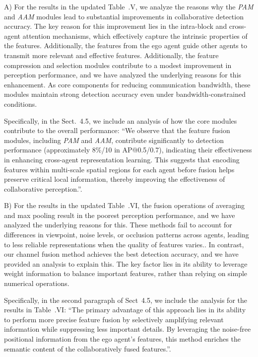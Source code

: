 \documentclass[12pt,a4paper]{article}
\begin{document}
A) For the results in the updated Table~.V, we analyze the reasons why the \textit{PAM} and \textit{AAM} modules lead to substantial improvements in collaborative detection accuracy. The key reason for this improvement lies in the intra-block and cross-agent attention mechanisms, which effectively capture the intrinsic properties of the features. Additionally, the features from the ego agent guide other agents to transmit more relevant and effective features.
Additionally, the feature compression and selection modules contribute to a modest improvement in perception performance, and we have analyzed the underlying reasons for this enhancement. As core components for reducing communication bandwidth, these modules maintain strong detection accuracy even under bandwidth-constrained conditions.

Specifically, in the Sect.~4.5, we include an analysis of how the core modules contribute to the overall performance: ``We observe that the feature fusion modules, including \textit{PAM} and \textit{AAM}, contribute significantly to detection performance (approximately 8\%/10 in AP@0.5/0.7), indicating their effectiveness in enhancing cross-agent representation learning.
This suggests that encoding features within multi-scale spatial regions for each agent before fusion helps preserve critical local information, thereby improving the effectiveness of collaborative perception.''.

B) For the results in the updated Table~.VI, the fusion operations of averaging and max pooling result in the poorest perception performance, and we have analyzed the underlying reasons for this.
These methods fail to account for differences in viewpoint, noise levels, or occlusion patterns across agents, leading to less reliable representations when the quality of features varies..
In contrast, our channel fusion method achieves the best detection accuracy, and we have provided an analysis to explain this. The key factor lies in its ability to leverage weight information to balance important features, rather than relying on simple numerical operations. 

Specifically, in the second paragraph of Sect~4.5, we include the analysis for the results in Table~.VI: ``The primary advantage of this approach lies in its ability to perform more precise feature fusion by selectively amplifying relevant information while suppressing less important details. By leveraging the noise-free positional information from the ego agent's features, this method enriches the semantic content of the collaboratively fused features.''.
\end{document}

